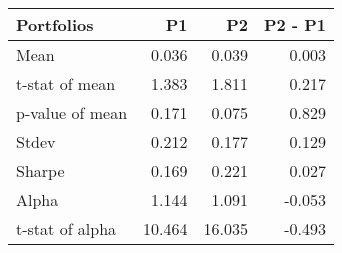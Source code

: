 \begin{tabular}{lrrr}
\toprule
Portfolios & P1 & P2 & P2 - P1 \\
\midrule
Mean & 0.036 & 0.039 & 0.003 \\
t-stat of mean & 1.383 & 1.811 & 0.217 \\
p-value of mean & 0.171 & 0.075 & 0.829 \\
Stdev & 0.212 & 0.177 & 0.129 \\
Sharpe & 0.169 & 0.221 & 0.027 \\
Alpha & 1.144 & 1.091 & -0.053 \\
t-stat of alpha & 10.464 & 16.035 & -0.493 \\
\bottomrule
\end{tabular}
